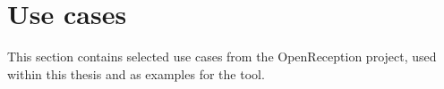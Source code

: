 \chapter{Use cases}
\label{appendix:use-cases}
This section contains selected use cases from the OpenReception project, used within this thesis and as examples for the tool.



